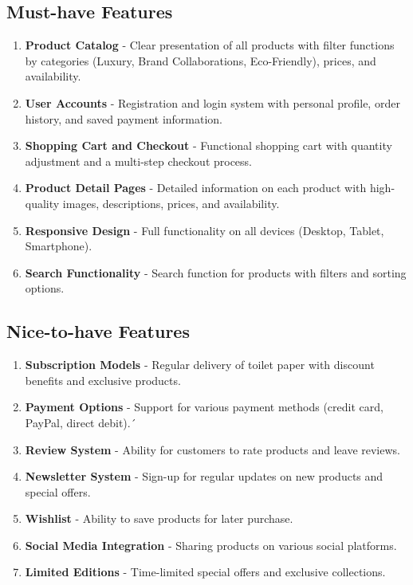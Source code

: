 \documentclass[a4paper,11pt]{article}
\begin{document}
\subsection{Must-have Features}
\begin{enumerate}[label=\textbf{MF\arabic*:}]
    \item \textbf{Product Catalog} - Clear presentation of all products with filter functions by categories (Luxury, Brand Collaborations, Eco-Friendly), prices, and availability.
    \item \textbf{User Accounts} - Registration and login system with personal profile, order history, and saved payment information.
    \item \textbf{Shopping Cart and Checkout} - Functional shopping cart with quantity adjustment and a multi-step checkout process.
    \item \textbf{Product Detail Pages} - Detailed information on each product with high-quality images, descriptions, prices, and availability.
    \item \textbf{Responsive Design} - Full functionality on all devices (Desktop, Tablet, Smartphone).
    \item \textbf{Search Functionality} - Search function for products with filters and sorting options.
    
\end{enumerate}

\subsection{Nice-to-have Features}
\begin{enumerate}[label=\textbf{NF\arabic*:}]
    \item \textbf{Subscription Models} - Regular delivery of toilet paper with discount benefits and exclusive products.
    
    \item \textbf{Payment Options} - Support for various payment methods (credit card, PayPal, direct debit).´
    \item \textbf{Review System} - Ability for customers to rate products and leave reviews.
    \item \textbf{Newsletter System} - Sign-up for regular updates on new products and special offers.
    \item \textbf{Wishlist} - Ability to save products for later purchase.
    \item \textbf{Social Media Integration} - Sharing products on various social platforms.
    \item \textbf{Limited Editions} - Time-limited special offers and exclusive collections.
\end{enumerate}
\end{document}
